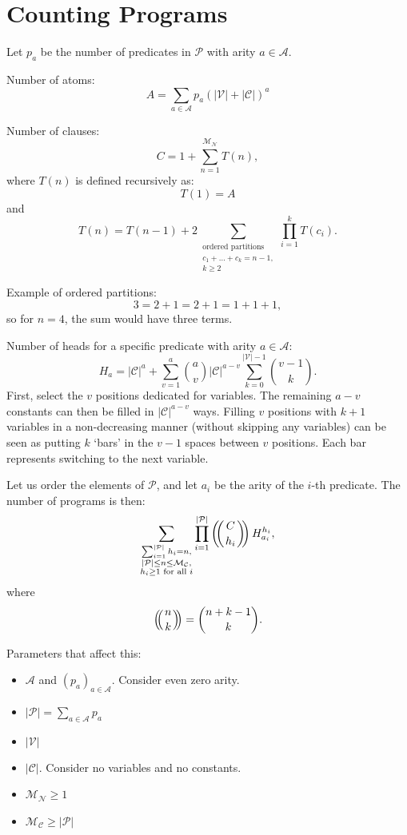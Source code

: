 \documentclass[runningheads]{llncs}
\newcommand{\predicates}{\mathcal{P}}
\newcommand{\variables}{\mathcal{V}}
\newcommand{\constants}{\mathcal{C}}
\newcommand{\arities}{\mathcal{A}}
\newcommand{\maxNumNodes}{\mathcal{M}_{\mathcal{N}}}
\newcommand{\maxNumClauses}{\mathcal{M}_{\mathcal{C}}}
\def\multiset#1#2{\ensuremath{\left(\kern-.3em\left(\genfrac{}{}{0pt}{}{#1}{#2}\right)\kern-.3em\right)}}
\begin{document}
\section{Counting Programs}

Let $p_a$ be the number of predicates in $\predicates{}$ with arity $a \in
\arities{}$.

Number of atoms:
\[
  A = \sum_{a \in \arities{}} p_a(|\variables{}| + |\constants{}|)^a
\]

Number of clauses:
\[
  C = 1 + \sum_{n=1}^{\maxNumNodes{}} T(n),
\]
where $T(n)$ is defined recursively as:
\[
  T(1) = A
\]
and
\[
  T(n) = T(n-1) + 2\sum_{\substack{\text{ordered partitions}\\
      c_1 + \dots + c_k = n - 1,\\
      k \ge 2}} \prod_{i=1}^k T(c_i).
\]

Example of ordered partitions:
\[
  3 = 2 + 1 = 2 + 1 = 1 + 1 + 1,
\]
so for $n=4$, the sum would have three terms.

Number of heads for a specific predicate with arity $a \in \arities{}$:
\[
  H_a = |\constants{}|^a + \sum_{v=1}^a \binom{a}{v} |\constants{}|^{a-v}
  \sum_{k=0}^{|\variables{}|-1} \binom{v-1}{k}.
\]
First, select the $v$ positions dedicated for variables. The remaining $a-v$
constants can then be filled in $|\constants{}|^{a-v}$ ways. Filling $v$
positions with $k+1$ variables in a non-decreasing manner (without skipping any
variables) can be seen as putting $k$ `bars' in the $v-1$ spaces between $v$
positions. Each bar represents switching to the next variable.

Let us order the elements of $\predicates{}$, and let $a_i$ be the arity of the
$i$-th predicate. The number of programs is then:
\[
  \sum_{\substack{ \sum_{i=1}^{|\predicates{}|} h_i = n,\\
      |\predicates{}| \le n \le \maxNumClauses,\\
      h_i \ge 1 \text{ for all } i}} \prod_{i=1}^{|\predicates{}|}
  \multiset{C}{h_i} H_{a_i}^{h_i},
\]
where
\[
  \multiset{n}{k} = \binom{n + k - 1}{k}.
\]

Parameters that affect this:
\begin{itemize}
\item $\arities{}$ and $(p_a)_{a \in \arities{}}$. Consider even zero arity.
\item $|\predicates{}| = \sum_{a \in \arities{}} p_a$
\item $|\variables{}|$
\item $|\constants{}|$. Consider no variables and no constants.
\item $\maxNumNodes{} \ge 1$
\item $\maxNumClauses{} \ge |\predicates{}|$
\end{itemize}
\end{document}
